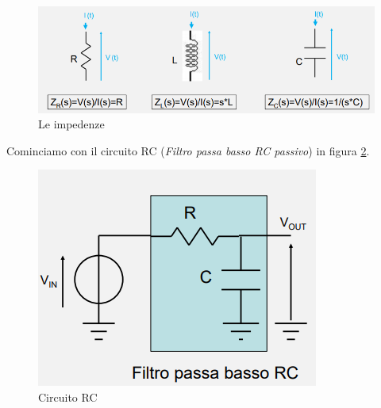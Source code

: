 \documentclass{article}
\begin{document}
\begin{figure}[h]
  \centering
  \includegraphics[scale=0.7]{IM_impedenze_bis}
  \caption{Le impedenze}
  \label{Schema_impedenze_bis}
\end{figure}
\clearpage
Cominciamo con il circuito RC (\textit{Filtro passa basso RC passivo}) in figura \ref{Schema_circuito_RC_passivo}.
\begin{figure}[h]
  \centering
  \includegraphics[scale=0.6]{IM_circuito_RC_passivo}
  \caption{Circuito RC}
  \label{Schema_circuito_RC_passivo}
\end{figure}
\end{document}
